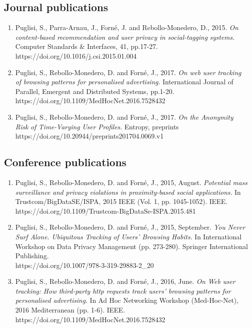 \subsection{Journal publications}
\begin{enumerate}
    \item Puglisi, S., Parra-Arnau, J., Forn\'e, J. and Rebollo-Monedero, D., 2015. \emph{On content-based recommendation and user privacy in social-tagging systems.} Computer Standards \& Interfaces, 41, pp.17-27. \\
    https://doi.org/10.1016/j.csi.2015.01.004
          
    \item Puglisi, S., Rebollo-Monedero, D. and Forn\'e, J., 2017. \emph{On web user tracking of browsing patterns for personalised advertising.} International Journal of Parallel, Emergent and Distributed Systems, pp.1-20. \\
    https://doi.org/10.1109/MedHocNet.2016.7528432
    
    \item Puglisi, S., Rebollo-Monedero, D. and Forn\'e, J., 2017. \emph{On the Anonymity Risk of Time-Varying User Profiles.} Entropy, preprints \\
    https://doi.org/10.20944/preprints201704.0069.v1
\end{enumerate}

\subsection{Conference publications}
\begin{enumerate}

    \item Puglisi, S., Rebollo-Monedero, D. and Forn\'e, J., 2015, August. \emph{Potential mass surveillance and privacy violations in proximity-based social applications.} In Trustcom/BigDataSE/ISPA, 2015 IEEE (Vol. 1, pp. 1045-1052). IEEE. \\
    https://doi.org/10.1109/Trustcom-BigDataSe-ISPA.2015.481
    
    \item Puglisi, S., Rebollo-Monedero, D. and Forn\'e, J., 2015, September. \emph{You Never Surf Alone. Ubiquitous Tracking of Users’ Browsing Habits.} In International Workshop on Data Privacy Management (pp. 273-280). Springer International Publishing. \\
    https://doi.org/10.1007/978-3-319-29883-2\_20
    
    \item Puglisi, S., Rebollo-Monedero, D. and Forn\'e, J., 2016, June. \emph{On Web user tracking: How third-party http requests track users' browsing patterns for personalised advertising.} In Ad Hoc Networking Workshop (Med-Hoc-Net), 2016 Mediterranean (pp. 1-6). IEEE. \\
    https://doi.org/10.1109/MedHocNet.2016.7528432

\end{enumerate}

